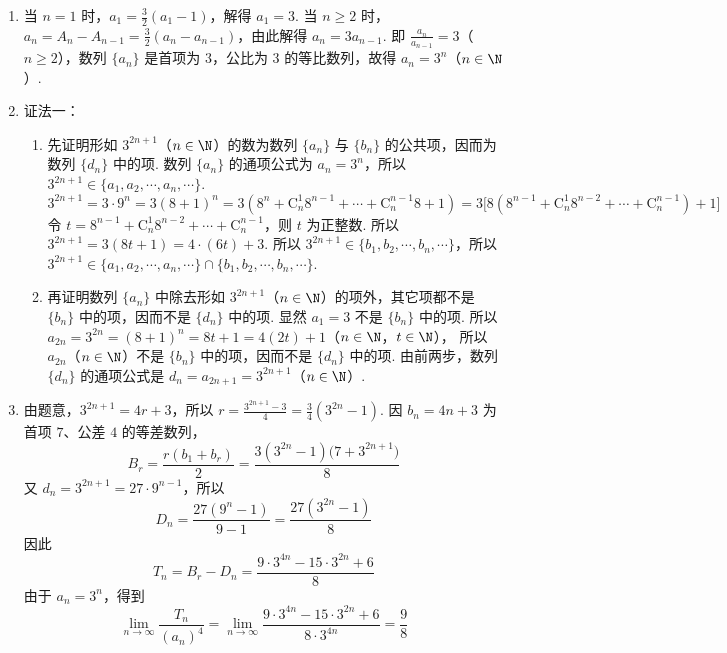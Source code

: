 \begin{solution}
\begin{enumerate}
\item 当 \(n=1\) 时，\(a_{1}=\frac{3}{2}(a_{1}-1)\)，解得 \(a_{1}=3\).
当 \(n\geqslant2\) 时，\(a_{n}=A_{n}-A_{n-1}=\frac{3}{2}(a_{n}-a_{n-1})\)，由此解得 \(a_{n}=3a_{n-1}\).
即 \(\frac{a_{n}}{a_{n-1}}=3\)（\(n\geqslant2\)），数列 \(\{a_{n}\}\) 是首项为 \(3\)，公比为 \(3\) 的等比数列，故得 \(a_{n}=3^{n}\)（\(n\in\N\)）.

\item 证法一：
\begin{enumerate}
\item 先证明形如 \(3^{2n+1}\)（\(n\in\N\)）的数为数列 \(\{a_{n}\}\) 与 \(\{b_{n}\}\) 的公共项，因而为数列 \(\{d_{n}\}\) 中的项.
数列 \(\{a_{n}\}\) 的通项公式为 \(a_{n}=3^{n}\)，所以 \(3^{2n+1}\in\{a_{1},a_{2},\cdots,a_{n},\cdots\}\).
\[
3^{2n+1}=3\cdot9^{n}=3(8+1)^{n}=3(8^{n}+\mathrm C_{n}^{1}8^{n-1}+\cdots+\mathrm C_{n}^{n-1}8+1)
=3\bigl[8(8^{n-1}+\mathrm C_{n}^{1}8^{n-2}+\cdots+\mathrm C_{n}^{n-1})+1\bigr]
\]
令 \(t=8^{n-1}+\mathrm C_{n}^{1}8^{n-2}+\cdots+\mathrm C_{n}^{n-1}\)，则 \(t\) 为正整数. 所以 \(3^{2n+1}=3(8t+1)=4\cdot(6t)+3\).
所以 \(3^{2n+1}\in\{b_{1},b_{2},\cdots,b_{n},\cdots\}\)，所以 \(3^{2n+1}\in\{a_{1},a_{2},\cdots,a_{n},\cdots\}\cap\{b_{1},b_{2},\cdots,b_{n},\cdots\}\).

\item 再证明数列 \(\{a_{n}\}\) 中除去形如 \(3^{2n+1}\)（\(n\in\N\)）的项外，其它项都不是 \(\{b_{n}\}\) 中的项，因而不是 \(\{d_{n}\}\) 中的项.
显然 \(a_{1}=3\) 不是 \(\{b_{n}\}\) 中的项. 所以 \(a_{2n}=3^{2n}=(8+1)^{n}=8t+1=4(2t)+1\)（\(n\in\N\)，\(t\in\N\)），
所以 \(a_{2n}\)（\(n\in\N\)）不是 \(\{b_{n}\}\) 中的项，因而不是 \(\{d_{n}\}\) 中的项.
由前两步，数列 \(\{d_{n}\}\) 的通项公式是 \(d_{n}=a_{2n+1}=3^{2n+1}\)（\(n\in\N\)）.

\end{enumerate}

\item
由题意，\(3^{2n+1}=4r+3\)，所以 \(r=\frac{3^{2n+1}-3}{4}=\frac{3}{4}\left(3^{2n}-1\right)\). 因 \(b_n=4n+3\) 为首项 \(7\)、公差 \(4\) 的等差数列，
\[
B_r=\frac{r(b_1+b_r)}{2}
=\frac{3(3^{2n}-1)\bigl(7+3^{2n+1}\bigr)}{8}
\]
又 \(d_n=3^{2n+1}=27\cdot9^{n-1}\)，所以
\[
D_n=\frac{27(9^n-1)}{9-1}=\frac{27(3^{2n}-1)}{8}
\]
因此
\[
T_n=B_r-D_n=\frac{9\cdot3^{4n}-15\cdot3^{2n}+6}{8}
\]
由于 \(a_n=3^n\)，得到
\[
\lim_{n\to\infty}\frac{T_n}{(a_n)^4}
=\lim_{n\to\infty}\frac{9\cdot3^{4n}-15\cdot3^{2n}+6}{8\cdot3^{4n}}
=\frac{9}{8}
\]
\end{enumerate}
\end{solution}

